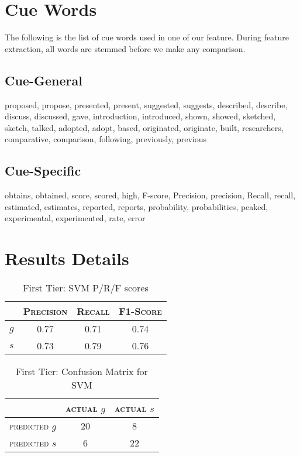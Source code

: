 \chapter{Cue Words}
\label{cuewords}
The following is the list of cue words used in one of our feature. During feature extraction, all words are stemmed before we make any comparison.
\section{Cue-General}
proposed, propose, presented, present, suggested, suggests, described, describe, discuss, discussed, gave, introduction, introduced, shown, showed, sketched, sketch, talked, adopted, adopt, based, originated, originate, built, researchers, comparative, comparison, following, previously, previous

\section{Cue-Specific}
obtains, obtained, score, scored, high, F-score, Precision, precision, Recall, recall, estimated, estimates, reported, reports, probability, probabilities, peaked, experimental, experimented, rate, error

\chapter{Results Details}
\label{resultsdetails}

\begin{table}[h]
	\center
	\begin{tabular}{ c | c  c  c }
		& \textsc{Precision} & \textsc{Recall} & \textsc{F1-Score} \\
		\hline
		\textsc{$g$} 	& 0.77 & 0.71 & 0.74 \\
		\textsc{$s$}	& 0.73 & 0.79 & 0.76
	\end{tabular}
	\caption{First Tier: SVM P/R/F scores}
\end{table}

\begin{table}[h]
	\center
	\begin{tabular}{ c | c  c }
		 & \textsc{actual $g$} & \textsc{actual $s$} \\
		\hline
		\textsc{predicted $g$} 	& 20 & 8 \\
		\textsc{predicted $s$}		& 6 & 22
	\end{tabular}
	\caption{First Tier: Confusion Matrix for SVM}
\end{table}

